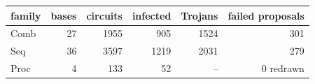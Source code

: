 \begin{tabular}{lrrrrr}
\hline
family & bases & circuits & infected & Trojans & failed proposals \\
\hline
Comb & 27 & 1955 & 905 & 1524 & 301 \\
Seq & 36 & 3597 & 1219 & 2031 & 279 \\
Proc & 4 & 133 & 52 & -- & 0 redrawn \\
\hline
\end{tabular}
